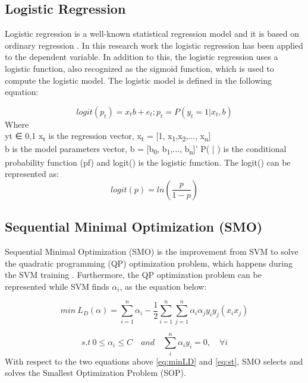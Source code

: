 \documentclass[review]{elsarticle}
\begin{document}
\subsection{Logistic Regression}
\label{subsec:Logistic}
Logistic regression is a well-known statistical regression model and it is based on ordinary regression \cite{Wilson2015}. In this research work the logistic regression has been applied to the dependent variable. In addition to this, the logistic regression uses a logistic function, also recognized as the sigmoid function, which is used to compute the logistic model. The logistic model is defined in the following equation:
	
 	\begin{equation}
 	logit(p_t) =x_tb+e_t; p_t=P(y_t =1|x_t,b)
 	\label{eq:logit_PT}
 	\end{equation}
 	Where \\
 	yt ∈ {0,1} 
 	x\textsubscript{t} is the regression vector, x\textsubscript{t} = [1, x\textsubscript{1},x\textsubscript{2},..., x\textsubscript{n}]\\
 	b is the model parameters vector, b = [b\textsubscript{0}, b\textsubscript{1},..., b\textsubscript{n}]’
 	P( | )  is the conditional probability function (pf) and 
 	logit() is the logistic function. The logit() can be represented as: 
 	\begin{equation}
 	logit(p)=ln(\dfrac{p}{1-p})
 	\label{eq:logit_P}
 	\end{equation}
	
\subsection{Sequential Minimal Optimization (SMO)}
\label{subsec:SMO}
Sequential Minimal Optimization (SMO) is the improvement from SVM to solve the quadratic programming (QP) optimization problem, which happens during the SVM training \cite{Platt1998}. Furthermore, the QP optimization problem can be represented while SVM finds $\alpha_i$, as the equation below:

 	\begin{equation}
 	min \ L_D(\alpha)= \sum_{i=1}^n \alpha_i -\dfrac{1}{2}\sum_{i=1}^n \sum_{j=1}^n \alpha_i \alpha_j y_iy_j(x_ix_j)
 	\label{eq:minLD}
 	\end{equation}
 	
 	\begin{equation}
 	s.t \ 0 \leq \alpha_i \leq C \quad  and \quad \sum_i^n \alpha_i y_i =0, \quad \forall i
    \label{eq:st}
 	\end{equation}
 	With respect to the two equations above \ref{eq:minLD} and \ref{eq:st}, SMO selects and solves the Smallest Optimization Problem (SOP).
	
\end{document}
